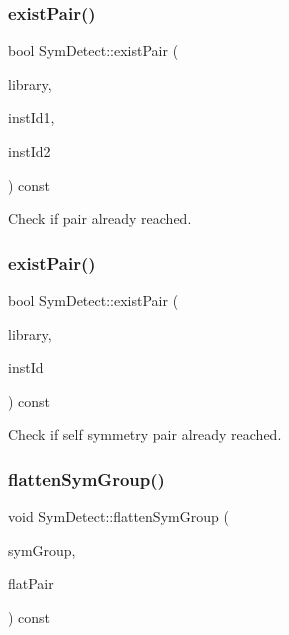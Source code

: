 \subsubsection{\texorpdfstring{exist\+Pair()}{existPair()}\hspace{0.1cm}{\footnotesize\ttfamily [1/2]}}
{\footnotesize\ttfamily bool Sym\+Detect\+::exist\+Pair (\begin{DoxyParamCaption}\item[{const std\+::vector$<$ \hyperlink{classMosPair}{Mos\+Pair} $>$ \&}]{library,  }\item[{\hyperlink{type_8h_a581e8093e28e7362f2b6937296190676}{Index\+Type}}]{inst\+Id1,  }\item[{\hyperlink{type_8h_a581e8093e28e7362f2b6937296190676}{Index\+Type}}]{inst\+Id2 }\end{DoxyParamCaption}) const\hspace{0.3cm}{\ttfamily [private]}}



Check if pair already reached. 

\mbox{\label{classSymDetect_a72b24ce0ad3992c207f5023250dd1d5a}} 
\subsubsection{\texorpdfstring{exist\+Pair()}{existPair()}\hspace{0.1cm}{\footnotesize\ttfamily [2/2]}}
{\footnotesize\ttfamily bool Sym\+Detect\+::exist\+Pair (\begin{DoxyParamCaption}\item[{std\+::vector$<$ \hyperlink{classMosPair}{Mos\+Pair} $>$ \&}]{library,  }\item[{\hyperlink{type_8h_a581e8093e28e7362f2b6937296190676}{Index\+Type}}]{inst\+Id }\end{DoxyParamCaption}) const\hspace{0.3cm}{\ttfamily [private]}}

Check if self symmetry pair already reached. \mbox{\label{classSymDetect_a4c50f078fd01ab52e8f50b0507b69556}} 
\subsubsection{\texorpdfstring{flatten\+Sym\+Group()}{flattenSymGroup()}}
{\footnotesize\ttfamily void Sym\+Detect\+::flatten\+Sym\+Group (\begin{DoxyParamCaption}\item[{std\+::vector$<$ std\+::vector$<$ \hyperlink{classMosPair}{Mos\+Pair} $>$$>$ \&}]{sym\+Group,  }\item[{std\+::vector$<$ \hyperlink{classMosPair}{Mos\+Pair} $>$ \&}]{flat\+Pair }\end{DoxyParamCaption}) const\hspace{0.3cm}{\ttfamily [private]}}



